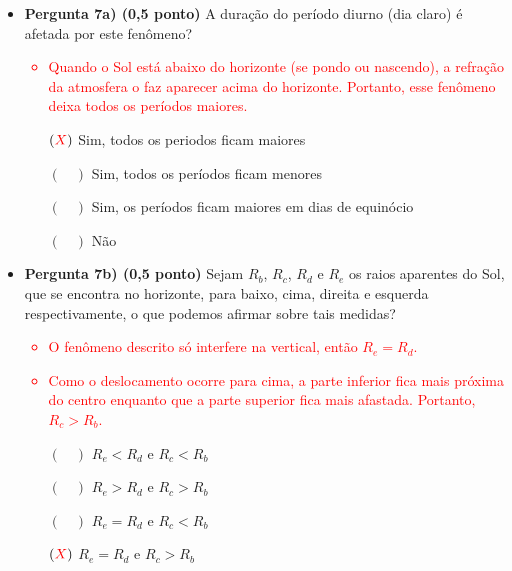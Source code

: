 \documentclass[a4paper, 12pt]{article}
\newcommand{\red}[1]{\textcolor{red}{#1}}
\begin{document}
\begin{flushleft}
\begin{itemize}
\begin{figure}[H]
                \end{figure}
                \begin{itemize}
                    \item \textbf{Pergunta 7a) (0,5 ponto)} A duração do período diurno (dia claro) é afetada por este fenômeno?
                        \red{\begin{itemize}
                            \item Quando o Sol está abaixo do horizonte (se pondo ou nascendo), a refração da atmosfera o faz aparecer acima do horizonte. Portanto, esse fenômeno deixa todos os períodos maiores.
                        \end{itemize}}
                        \begin{itemize}
                            \item[$(\red{X})$] Sim, todos os periodos ficam maiores
                            \item[$(\quad)$] Sim, todos os períodos ficam menores
                            \item[$(\quad)$] Sim, os períodos ficam maiores em dias de equinócio
                            \item[$(\quad)$] Não
                        \end{itemize}
                    \item \textbf{Pergunta 7b) (0,5 ponto)} Sejam $R_b$, $R_c$, $R_d$ e $R_e$ os raios aparentes do Sol, que se encontra no horizonte, para baixo, cima, direita e esquerda respectivamente, o que podemos afirmar sobre tais medidas?
                        \red{\begin{itemize}
                            \item O fenômeno descrito só interfere na vertical, então $R_e=R_d$.
                            \item Como o deslocamento ocorre para cima, a parte inferior fica mais próxima do centro enquanto que a parte superior fica mais afastada. Portanto, $R_c>R_b$.
                        \end{itemize}}
                        \begin{itemize}
                            \item[$(\quad)$] $R_e<R_d$ e $R_c<R_b$
                            \item[$(\quad)$] $R_e>R_d$ e $R_c>R_b$
                            \item[$(\quad)$] $R_e=R_d$ e $R_c<R_b$
                            \item[$(\red{X})$] $R_e=R_d$ e $R_c>R_b$
                        \end{itemize}
                \end{itemize}
        \end{itemize} \end{flushleft}
\end{document}
